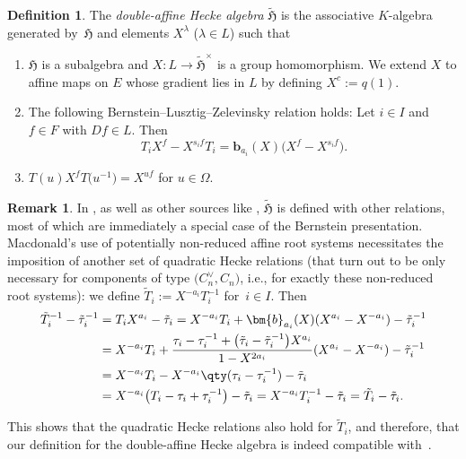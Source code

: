 \documentclass[10pt,a4paper]{amsart}
\theoremstyle{definition}
\newtheorem{Definition}[Theorem]{Definition}
\newtheorem{Remark}[Theorem]{Remark}
\numberwithin{equation}{section}
\begin{document}
\begin{Definition}
 The \emph{double-affine Hecke algebra} $\tilde{\mathfrak{H}}$ is
 the associative $K$-algebra generated by~$\mathfrak{H}$ and elements $X^\lambda$ ($\lambda\in L$) such that
 \begin{enumerate}\itemsep=0pt
 \item[(i)] $\mathfrak{H}$ is a subalgebra and $X\colon L\to\tilde{\mathfrak{H}}^\times$
 is a group homomorphism. We extend $X$ to affine maps on $E$ whose gradient lies
 in $L$ by defining $X^c := q(1)$.
 \item[(ii)] The following Bernstein--Lusztig--Zelevinsky relation holds: Let $i\in I$ and $f\in F$ with $Df\in L$. Then
 \begin{equation}\label{eq:x-bernstein}
 T_i X^f - X^{s_if}T_i = \bm{b}_{a_i}(X)\bigl(X^f - X^{s_if}\bigr).
 \end{equation}
 \item[(iii)] $T(u) X^f T\bigl(u^{-1}\bigr) = X^{uf}$ for $u\in\Omega$.
 \end{enumerate}
\end{Definition}
\begin{Remark}
 In \cite[Section~4.7]{macdonald}, as well as other sources
 like \cite[Definition~2.1]{cherednikInduced}, $\tilde{\mathfrak{H}}$
 is defined with other relations, most of which are immediately a special case of
 the Bernstein presentation. Macdonald's use of potentially non-reduced affine root
 systems necessitates the imposition of another set of quadratic Hecke relations
 (that turn out to be only necessary for components of type $\bigl(C_n^\vee, C_n\bigr)$, i.e., for exactly these non-reduced root systems):
 we define
$\tilde{T}_i := X^{-a_i} T_i^{-1}$
 for~${i\in I}$. Then
 \begin{align*}
 \tilde{T}_i^{-1} - \tilde{\tau}_i^{-1} &=
 T_i X^{a_i} - \tilde{\tau}_i= X^{-a_i}T_i + \bm{b}_{a_i}(X)(X^{a_i}-X^{-a_i}) - \tilde{\tau}_i^{-1}\\
 &= X^{-a_i}T_i + \frac{\tau_i - \tau_i^{-1} + \bigl(\tilde{\tau}_i-\tilde{\tau}_i^{-1}\bigr)X^{a_i}}{1-X^{2a_i}} (X^{a_i}-X^{-a_i}) - \tilde{\tau}_i^{-1}\\
 &= X^{-a_i}T_i - X^{-a_i}\qty(\tau_i - \tau_i^{-1})
 - \tilde{\tau}_i\\
 &= X^{-a_i}\bigl(T_i - \tau_i + \tau_i^{-1}\bigr) - \tilde{\tau}_i= X^{-a_i} T_i^{-1} - \tilde{\tau}_i= \tilde{T}_i - \tilde{\tau}_i.
 \end{align*}

 This shows that the quadratic Hecke relations also hold for $\tilde{T}_i$, and therefore, that our definition for the double-affine
 Hecke algebra is indeed compatible with~\cite{cherednikInduced,macdonald}.
\end{Remark}
\end{document}
